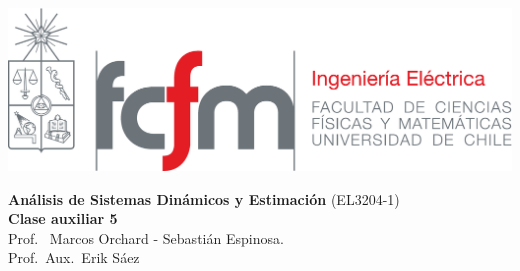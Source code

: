 \documentclass[
  11pt,
  letterpaper,
   addpoints,
  answers
  ]{exam}
\begin{document}
\pagestyle{plain}

\noindent
\begin{minipage}{0.47\textwidth}
\includegraphics[width=\textwidth]{../fcfm_die}
\end{minipage}
\begin{minipage}{0.53\textwidth}
\begin{center} 
\large\textbf{Análisis de Sistemas Dinámicos y Estimación} (EL3204-1) \\
\large\textbf{Clase auxiliar 5} \\
\normalsize Prof.~ Marcos Orchard - Sebastián Espinosa.\\
\normalsize Prof.~Aux.~Erik Sáez
\end{center}
\end{minipage}

\vspace{0.5cm}
\noindent
\vspace{.85cm}
\end{document}
